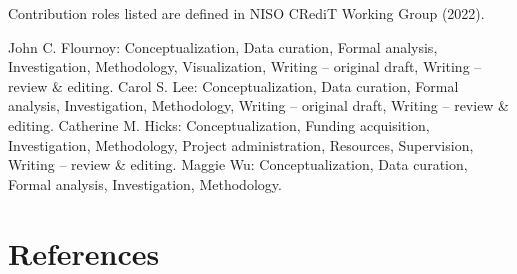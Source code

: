 \documentclass[
]{article}
\begin{document}
Contribution roles listed are defined in NISO CRediT Working Group
(2022).

John C. Flournoy: Conceptualization, Data curation, Formal analysis,
Investigation, Methodology, Visualization, Writing -- original draft,
Writing -- review \& editing. Carol S. Lee: Conceptualization, Data
curation, Formal analysis, Investigation, Methodology, Writing --
original draft, Writing -- review \& editing. Catherine M. Hicks:
Conceptualization, Funding acquisition, Investigation, Methodology,
Project administration, Resources, Supervision, Writing -- review \&
editing. Maggie Wu: Conceptualization, Data curation, Formal analysis,
Investigation, Methodology.

\section*{References}\label{references}
\end{document}
